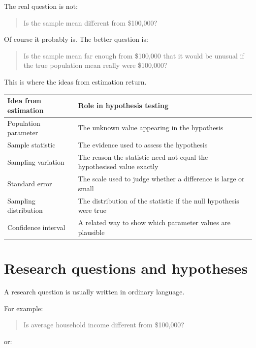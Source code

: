 \documentclass[
  letterpaper,
  DIV=11,
  numbers=noendperiod]{scrreprt}
\begin{document}
The real question is not:

\begin{quote}
Is the sample mean different from \$100,000?
\end{quote}

Of course it probably is. The better question is:

\begin{quote}
Is the sample mean far enough from \$100,000 that it would be unusual if
the true population mean really were \$100,000?
\end{quote}

This is where the ideas from estimation return.

\begin{table}
\fontsize{12.0pt}{14.0pt}\selectfont
\begin{tabular*}{\linewidth}{@{\extracolsep{\fill}}ll}
\toprule
Idea from estimation & Role in hypothesis testing \\ 
\midrule\addlinespace[2.5pt]
Population parameter & The unknown value appearing in the hypothesis \\ 
Sample statistic & The evidence used to assess the hypothesis \\ 
Sampling variation & The reason the statistic need not equal the hypothesised value exactly \\ 
Standard error & The scale used to judge whether a difference is large or small \\ 
Sampling distribution & The distribution of the statistic if the null hypothesis were true \\ 
Confidence interval & A related way to show which parameter values are plausible \\ 
\bottomrule
\end{tabular*}
\end{table}

\section{Research questions and
hypotheses}\label{research-questions-and-hypotheses}

A research question is usually written in ordinary language.

For example:

\begin{quote}
Is average household income different from \$100,000?
\end{quote}

or:
\end{document}
